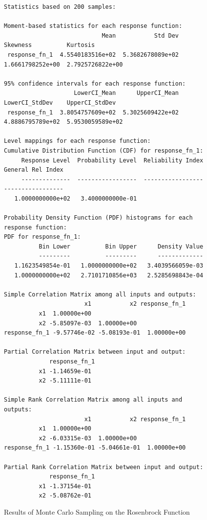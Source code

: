 \begin{figure}
\centering
\begin{bigbox}
\begin{footnotesize}
\begin{verbatim}
Statistics based on 200 samples:

Moment-based statistics for each response function:
                            Mean           Std Dev          Skewness          Kurtosis
 response_fn_1  4.5540183516e+02  5.3682678089e+02  1.6661798252e+00  2.7925726822e+00

95% confidence intervals for each response function:
                    LowerCI_Mean      UpperCI_Mean    LowerCI_StdDev    UpperCI_StdDev
 response_fn_1  3.8054757609e+02  5.3025609422e+02  4.8886795789e+02  5.9530059589e+02

Level mappings for each response function:
Cumulative Distribution Function (CDF) for response_fn_1:
     Response Level  Probability Level  Reliability Index  General Rel Index
     --------------  -----------------  -----------------  -----------------
   1.0000000000e+02   3.4000000000e-01

Probability Density Function (PDF) histograms for each response function:
PDF for response_fn_1:
          Bin Lower          Bin Upper      Density Value
          ---------          ---------      -------------
   1.1623549854e-01   1.0000000000e+02   3.4039566059e-03
   1.0000000000e+02   2.7101710856e+03   2.5285698843e-04

Simple Correlation Matrix among all inputs and outputs:
                       x1           x2 response_fn_1 
          x1  1.00000e+00 
          x2 -5.85097e-03  1.00000e+00 
response_fn_1 -9.57746e-02 -5.08193e-01  1.00000e+00 

Partial Correlation Matrix between input and output:
             response_fn_1 
          x1 -1.14659e-01 
          x2 -5.11111e-01 

Simple Rank Correlation Matrix among all inputs and outputs:
                       x1           x2 response_fn_1 
          x1  1.00000e+00 
          x2 -6.03315e-03  1.00000e+00 
response_fn_1 -1.15360e-01 -5.04661e-01  1.00000e+00 

Partial Rank Correlation Matrix between input and output:
             response_fn_1 
          x1 -1.37154e-01 
          x2 -5.08762e-01 
\end{verbatim}
\end{footnotesize}
\end{bigbox}
\caption{Results of Monte Carlo Sampling on the Rosenbrock Function}
\label{tutorial:results_mc}
\end{figure}


